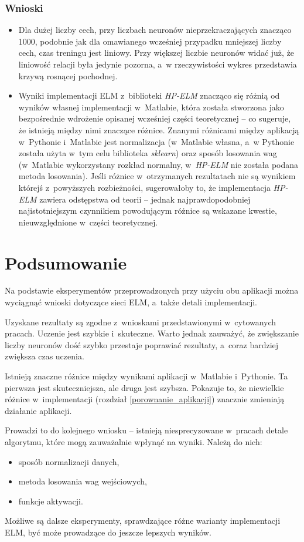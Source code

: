 \documentclass{article}
\begin{document}
\subsubsection{Wnioski}
\begin{itemize}
\item Dla dużej liczby cech, przy liczbach neuronów nieprzekraczających znacząco 1000, podobnie jak dla omawianego wcześniej przypadku mniejszej liczby cech, czas treningu jest liniowy. Przy większej liczbie neuronów widać już, że liniowość relacji była jedynie pozorna, a~w rzeczywistości wykres przedstawia krzywą rosnącej pochodnej.
\item Wyniki implementacji ELM z~biblioteki \textit{HP-ELM} znacząco się różnią od wyników własnej implementacji w~Matlabie, która została stworzona jako bezpośrednie wdrożenie opisanej wcześniej części teoretycznej -- co sugeruje, że istnieją między nimi znaczące różnice. Znanymi różnicami między aplikacją w~Pythonie i~Matlabie jest normalizacja (w~Matlabie własna, a~w Pythonie została użyta w~tym celu biblioteka \textit{sklearn}) oraz sposób losowania wag (w~Matlabie wykorzystany rozkład normalny, w~\textit{HP-ELM} nie została podana metoda losowania). Jeśli różnice w~otrzymanych rezultatach nie są wynikiem którejś z~powyższych rozbieżności, sugerowałoby to, że implementacja \textit{HP-ELM} zawiera odstępstwa od teorii -- jednak najprawdopodobniej najistotniejszym czynnikiem powodującym różnice są wskazane kwestie, nieuwzględnione w~części teoretycznej.
\end{itemize}
\clearpage
\section*{Podsumowanie}
Na podstawie eksperymentów przeprowadzonych przy użyciu obu aplikacji można wyciągnąć wnioski dotyczące sieci ELM, a~także detali implementacji.

Uzyskane rezultaty są zgodne z~wnioskami przedstawionymi w~cytowanych pracach.
Uczenie jest szybkie i~skuteczne.
Warto jednak zauważyć, że zwiększanie liczby neuronów dość szybko przestaje poprawiać rezultaty, a~coraz bardziej zwiększa czas uczenia.

Istnieją znaczne różnice między wynikami aplikacji w~Matlabie i~Pythonie. Ta pierwsza jest skuteczniejsza, ale druga jest szybsza. Pokazuje to, że niewielkie różnice w~implementacji (rozdział \ref{porownanie_aplikacji}) znacznie zmieniają działanie aplikacji.

Prowadzi to do kolejnego wniosku -- istnieją niesprecyzowane w~pracach detale algorytmu, które mogą zauważalnie wpłynąć na wyniki.
Należą do nich:
\begin{itemize}
\item sposób normalizacji danych, 
\item metoda losowania wag wejściowych,
\item funkcje aktywacji.
\end{itemize}
Możliwe są dalsze eksperymenty, sprawdzające różne warianty implementacji ELM, być może prowadzące do jeszcze lepszych wyników.
\clearpage
{}
\end{document}

